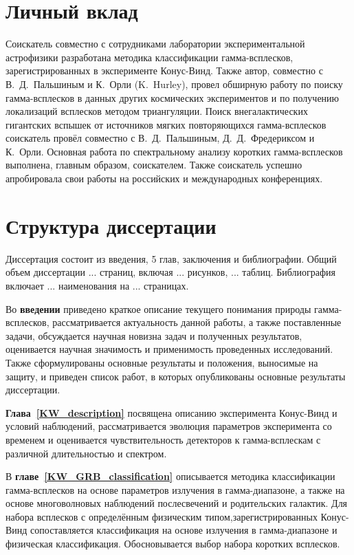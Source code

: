 \section{Личный вклад}
Соискатель совместно с сотрудниками лаборатории экспериментальной астрофизики 
разработана методика классификации гамма-всплесков, зарегистрированных в эксперименте 
Конус-Винд. Также автор, совместно с В.~Д.~Пальшиным и К.~Орли (K.~Hurley), 
провел обширную работу по поиску гамма-всплесков в данных других космических 
экспериментов и по получению локализаций всплесков методом триангуляции.
Поиск внегалактических гигантских вспышек от источников мягких повторяющихся
гамма-всплесков соискатель провёл совместно с В.~Д.~Пальшиным, Д.~Д.~Фредериксом и К.~Орли. 
Основная работа по спектральному анализу коротких гамма-всплесков выполнена, главным образом, соискателем.
Также соискатель успешно апробировала свои работы на российских и международных конференциях.

\section{Структура диссертации}
Диссертация состоит из введения, 5 глав, заключения и библиографии.
Общий объем диссертации ... страниц, включая ... рисунков, ... таблиц. 
Библиография включает ... наименования на ... страницах.

Во \textbf{введении} приведено краткое описание текущего понимания природы гамма-всплесков,
рассматривается актуальность данной работы, а также поставленные задачи, 
обсуждается научная новизна задач и полученных результатов, 
оценивается научная значимость и применимость проведенных исследований.
Также сформулированы основные результаты и положения, выносимые на защиту, и приведен
список работ, в которых опубликованы основные результаты диссертации.

\textbf{Глава~\ref{KW_description}} посвящена описанию эксперимента Конус-Винд и условий
наблюдений, рассматривается эволюция параметров эксперимента со временем и 
оценивается чувствительность детекторов к гамма-всплескам с различной длительностью и спектром.

В \textbf{главе~\ref{KW_GRB_classification}} описывается методика классификации 
гамма-всплесков на основе параметров излучения в гамма-диапазоне, а также на основе 
многоволновых наблюдений послесвечений и родительских галактик. Для набора всплесков
с определённым физическим типом,зарегистрированных Конус-Винд сопоставляется 
классификация на основе излучения в гамма-диапазоне и физическая классификация.
Обосновывается выбор набора коротких всплесков.

